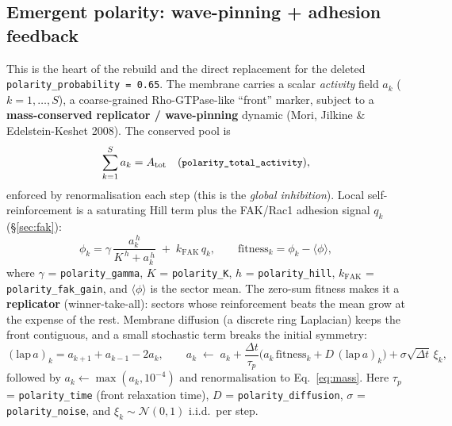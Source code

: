\documentclass[11pt]{article}
\newcommand{\dt}{\Delta t}
\newcommand{\code}[1]{\texttt{\small #1}}
\begin{document}
\subsection{Emergent polarity: wave-pinning + adhesion feedback}
\label{sec:polarity}

This is the heart of the rebuild and the direct replacement for the deleted
\code{polarity\_probability = 0.65}. The membrane carries a scalar \emph{activity}
field $a_k$ ($k=1,\dots,S$), a coarse-grained Rho-GTPase-like ``front'' marker, subject to a
\textbf{mass-conserved replicator / wave-pinning} dynamic (Mori, Jilkine \& Edelstein-Keshet 2008).
The conserved pool is
\begin{equation}
  \sum_{k=1}^{S} a_k = A_{\text{tot}} \quad(\text{\code{polarity\_total\_activity}}),
  \label{eq:mass}
\end{equation}
enforced by renormalisation each step (this is the \emph{global inhibition}). Local
self-reinforcement is a saturating Hill term plus the FAK/Rac1 adhesion signal $q_k$
(\S\ref{sec:fak}):
\begin{equation}
  \phi_k = \gamma\,\frac{a_k^{\,h}}{K^{\,h}+a_k^{\,h}} \;+\; k_{\text{FAK}}\,q_k,
  \qquad
  \text{fitness}_k = \phi_k - \langle\phi\rangle,
  \label{eq:fitness}
\end{equation}
where $\gamma$ = \code{polarity\_gamma}, $K$ = \code{polarity\_K}, $h$ = \code{polarity\_hill},
$k_{\text{FAK}}$ = \code{polarity\_fak\_gain}, and $\langle\phi\rangle$ is the sector mean. The
zero-sum fitness makes it a \textbf{replicator} (winner-take-all): sectors whose reinforcement
beats the mean grow at the expense of the rest. Membrane diffusion (a discrete ring Laplacian)
keeps the front contiguous, and a small stochastic term breaks the initial symmetry:
\begin{equation}
  (\text{lap}\,a)_k = a_{k+1} + a_{k-1} - 2a_k,
  \qquad
  a_k \;\leftarrow\; a_k
  + \frac{\dt}{\tau_p}\bigl(a_k\,\text{fitness}_k + D\,(\text{lap}\,a)_k\bigr)
  + \sigma\sqrt{\dt}\,\xi_k,
  \label{eq:polarity}
\end{equation}
followed by $a_k\leftarrow\max(a_k,10^{-4})$ and renormalisation to
Eq.~\eqref{eq:mass}. Here $\tau_p$ = \code{polarity\_time} (front relaxation time),
$D$ = \code{polarity\_diffusion}, $\sigma$ = \code{polarity\_noise}, and
$\xi_k\sim\mathcal N(0,1)$ i.i.d.\ per step.
\end{document}
